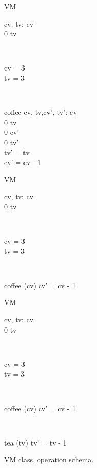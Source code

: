\begin{figure}[H]
\centering
\begin{sidebyside}[3]
\begin{class}{VM}
\\
\begin{state}
cv, tv: \integer
{} \leq  cv 
\\
0 \leq  tv 
\end{state} 
\\
\begin{init}
cv = 3
\\tv = 3
\end{init} 
\\
\begin{op}{coffee}
cv, tv,cv', tv': \integer
{} \leq  cv 
\\
0 \leq  tv 
\\
0 \leq  cv' 
\\
0 \leq  tv' 
\\
tv' = tv
\\
cv' = cv - 1
\end{op}
\end{class}
\nextside
\begin{class}{VM}
\\
\begin{state}
cv, tv: \integer
{} \leq  cv 
\\
0 \leq  tv 
\end{state} 
\\
\begin{init}
cv = 3
\\tv = 3
\end{init} 
\\
\begin{op}{coffee}
\Delta (cv)
\ST
cv' = cv - 1
\end{op}
\end{class}
\nextside
\begin{class}{VM}
\\
\begin{state}
cv, tv: \integer
{} \leq  cv 
\\
0 \leq  tv 
\end{state} 
\\
\begin{init}
cv = 3
\\tv = 3
\end{init} 
\\
\begin{op}{coffee}
\Delta (cv)
\ST
cv' = cv - 1
\end{op}
\\
\begin{op}{tea}
\Delta (tv)
\ST
tv' = tv - 1
\end{op}
\end{class}
\end{sidebyside}
\caption{VM class, operation schema.}
\label{fig_oz_vm_operation_schema}
\end{figure}
